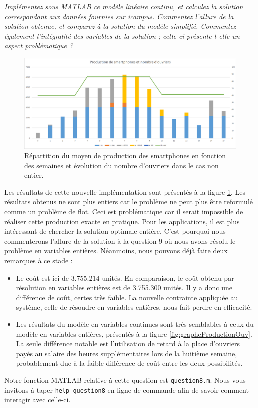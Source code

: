 \question %
\emph{Implémentez sous MATLAB ce modèle linéaire continu,
et calculez la solution correspondant aux données fournies sur icampus.
Commentez l'allure de la solution obtenue, et comparez à la solution du modèle
simplifié. Commentez également l'intégralité des variables de la solution ;
celle-ci présente-t-elle un aspect problématique ?}

\begin{figure}[H]
  \begin{center}
    \includegraphics[scale = 0.75]{img/grapheProductionOuvNonInt.png}
	  \caption{Répartition du moyen de production des smartphones en fonction des semaines et évolution du nombre d'ouvriers dans le cas non entier.}
	  \label{fig:grapheProductionOuvNonInt}
  \end{center}
\end{figure}

Les résultats de cette nouvelle implémentation sont présentés à la figure \ref{fig:grapheProductionOuvNonInt}. Les résultats obtenus ne sont plus entiers car le problème ne peut plus être reformulé comme un problème de flot. Ceci est problématique car il serait impossible de réaliser cette production exacte en pratique. Pour les applications, il est plus intéressant de chercher la solution optimale entière. C'est pourquoi nous commenterons l'allure de la solution à la question 9 où nous avons résolu le problème en variables entières. Néanmoins, nous pouvons déjà faire deux remarques à ce stade :
\begin{itemize}
\item Le coût est ici de 3.755.214 unités. En comparaison, le coût obtenu par résolution en variables entières est de 3.755.300 unités. Il y a donc une différence de coût, certes très faible. La nouvelle contrainte appliquée au système, celle de résoudre en variables entières, nous fait perdre en efficacité. 
\item Les résultats du modèle en variables continues sont très semblables à ceux du modèle en variables entières, présentés à la figure \ref{fig:grapheProductionOuv}. La seule différence notable est l'utilisation de retard à la place d'ouvriers payés au salaire des heures supplémentaires lors de la huitième semaine, probablement due à la faible différence de coût entre les deux possibilités.
\end{itemize}

Notre fonction MATLAB relative à cette question est \texttt{question8.m}. Nous vous invitons à taper \texttt{help question8} en ligne de commande afin de savoir comment interagir avec celle-ci.